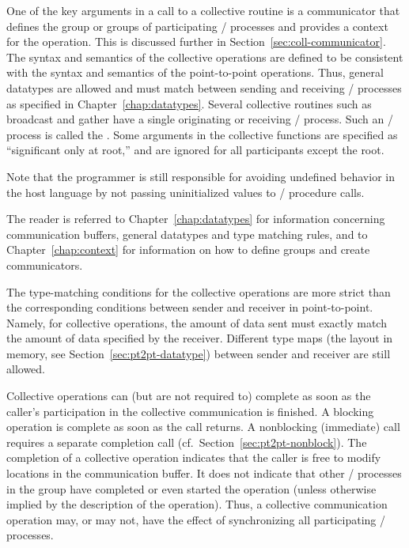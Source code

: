 One of the key arguments
in a call to a collective routine
is a communicator that defines the group
or groups
of participating \MPI/ processes and provides a context for the operation.
This is discussed further in Section~\ref{sec:coll-communicator}.
The syntax and semantics of the collective operations are
defined to be consistent with the syntax and semantics of the
point-to-point operations. Thus, general datatypes are allowed
and must match between sending and receiving \MPI/ processes as specified
in
Chapter~\ref{chap:datatypes}.
Several collective routines such as broadcast and gather have
a single originating or receiving \MPI/ process.
Such an \MPI/ process is
called the .
Some arguments in the collective functions are specified as
``significant only at root,'' and are ignored for all
participants except the root.

\begin{users}
Note that the programmer is still responsible for avoiding undefined behavior in the host language by not passing uninitialized values to \mpi/ procedure calls.
\end{users}

The reader is referred to Chapter~\ref{chap:datatypes}
for information concerning communication buffers,
general datatypes and type matching rules, and to
Chapter~\ref{chap:context} for information on how to define groups and
create communicators.

The type-matching conditions for the collective operations are more
strict than the corresponding conditions between sender and receiver
in point-to-point.  Namely, for collective operations,
the amount of data sent must exactly
match the amount of data specified by the receiver.
Different
type maps (the layout in memory, see Section~\ref{sec:pt2pt-datatype})
between sender and receiver are still allowed.

Collective operations can (but are not required to)
complete as soon as the
caller's
participation in the collective communication is
finished.  A blocking operation is
complete as soon as the call returns. A nonblocking (immediate) call
requires a separate completion call (cf.\ Section~\ref{sec:pt2pt-nonblock}).
The completion
of a collective operation indicates that the caller
is free to modify locations in the
communication buffer.  It does not indicate that other \MPI/ processes in
the group have completed or even
started the operation (unless otherwise
implied by
the description of the operation).
Thus, a collective communication operation may, or may not,
have the effect of synchronizing all participating \MPI/ processes.

